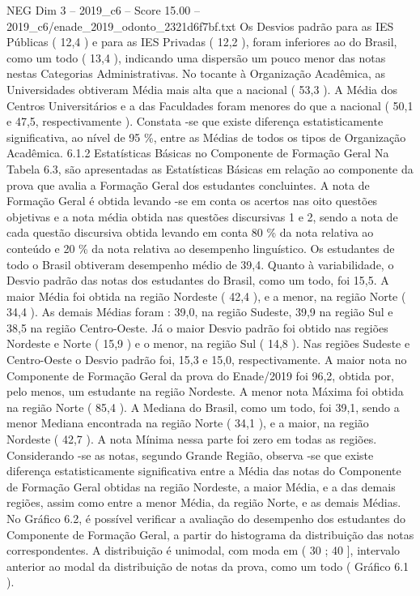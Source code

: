 \begin{textsample}{NEG Dim 3 – 2019\_c6 – Score 15.00 – 2019\_c6/enade\_2019\_odonto\_2321d6f7bf.txt}
Os Desvios padrão para as IES Públicas ( 12,4 ) e para as IES Privadas ( 12,2 ), foram inferiores ao do Brasil, como um todo ( 13,4 ), indicando uma dispersão um pouco menor das notas nestas Categorias Administrativas.
No tocante à Organização Acadêmica, as Universidades obtiveram Média mais alta que a nacional ( 53,3 ).
A Média dos Centros Universitários e a das Faculdades foram menores do que a nacional ( 50,1 e 47,5, respectivamente ).
Constata -se que existe diferença estatisticamente significativa, ao nível de 95 \%, entre as Médias de todos os tipos de Organização Acadêmica. 6.1.2 Estatísticas Básicas no Componente de Formação Geral Na Tabela 6.3, são apresentadas as Estatísticas Básicas em relação ao componente da prova que avalia a Formação Geral dos estudantes concluintes.
A nota de Formação Geral é obtida levando -se em conta os acertos nas oito questões objetivas e a nota média obtida nas questões discursivas 1 e 2, sendo a nota de cada questão discursiva obtida levando em conta 80 \% da nota relativa ao conteúdo e 20 \% da nota relativa ao desempenho linguístico.
Os estudantes de todo o Brasil obtiveram desempenho médio de 39,4.
Quanto à variabilidade, o Desvio padrão das notas dos estudantes do Brasil, como um todo, foi 15,5.
A maior Média foi obtida na região Nordeste ( 42,4 ), e a menor, na região Norte ( 34,4 ).
As demais Médias foram : 39,0, na região Sudeste, 39,9 na região Sul e 38,5 na região Centro-Oeste.
Já o maior Desvio padrão foi obtido nas regiões Nordeste e Norte ( 15,9 ) e o menor, na região Sul ( 14,8 ).
Nas regiões Sudeste e Centro-Oeste o Desvio padrão foi, 15,3 e 15,0, respectivamente.
A maior nota no Componente de Formação Geral da prova do Enade/2019 foi 96,2, obtida por, pelo menos, um estudante na região Nordeste.
A menor nota Máxima foi obtida na região Norte ( 85,4 ).
A Mediana do Brasil, como um todo, foi 39,1, sendo a menor Mediana encontrada na região Norte ( 34,1 ), e a maior, na região Nordeste ( 42,7 ).
A nota Mínima nessa parte foi zero em todas as regiões.
Considerando -se as notas, segundo Grande Região, observa -se que existe diferença estatisticamente significativa entre a Média das notas do Componente de Formação Geral obtidas na região Nordeste, a maior Média, e a das demais regiões, assim como entre a menor Média, da região Norte, e as demais Médias.
No Gráfico 6.2, é possível verificar a avaliação do desempenho dos estudantes do Componente de Formação Geral, a partir do histograma da distribuição das notas correspondentes.
A distribuição é unimodal, com moda em ( 30 ; 40 ], intervalo anterior ao modal da distribuição de notas da prova, como um todo ( Gráfico 6.1 ).

\end{textsample}
